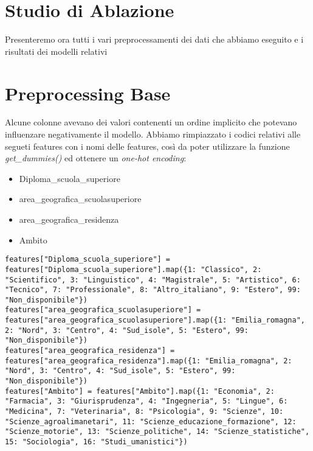 \documentclass[../../Report.tex]{subfiles}
\begin{document}
\section{Studio di Ablazione}
Presenteremo ora tutti i vari preprocessamenti dei dati che abbiamo eseguito e i risultati dei modelli relativi 
\section{Preprocessing Base}
Alcune colonne avevano dei valori contenenti un ordine implicito che potevano influenzare negativamente il modello. 
Abbiamo rimpiazzato i codici relativi alle segueti features con i nomi delle features, così da poter utilizzare la funzione \emph{get\_dummies()} ed ottenere un \emph{one-hot encoding}:
\begin{itemize}
    \item Diploma\_scuola\_superiore
    \item area\_geografica\_scuolasuperiore
    \item area\_geografica\_residenza
    \item Ambito
\end{itemize}

\begin{lstlisting}
features["Diploma_scuola_superiore"] = features["Diploma_scuola_superiore"].map({1: "Classico", 2: "Scientifico", 3: "Linguistico", 4: "Magistrale", 5: "Artistico", 6: "Tecnico", 7: "Professionale", 8: "Altro_italiano", 9: "Estero", 99: "Non_disponibile"})
features["area_geografica_scuolasuperiore"] = features["area_geografica_scuolasuperiore"].map({1: "Emilia_romagna", 2: "Nord", 3: "Centro", 4: "Sud_isole", 5: "Estero", 99: "Non_disponibile"})
features["area_geografica_residenza"] = features["area_geografica_residenza"].map({1: "Emilia_romagna", 2: "Nord", 3: "Centro", 4: "Sud_isole", 5: "Estero", 99: "Non_disponibile"})
features["Ambito"] = features["Ambito"].map({1: "Economia", 2: "Farmacia", 3: "Giurisprudenza", 4: "Ingegneria", 5: "Lingue", 6: "Medicina", 7: "Veterinaria", 8: "Psicologia", 9: "Scienze", 10: "Scienze_agroalimanetari", 11: "Scienze_educazione_formazione", 12: "Scienze_motorie", 13: "Scienze_politiche", 14: "Scienze_statistiche", 15: "Sociologia", 16: "Studi_umanistici"})
\end{lstlisting}
\end{document}
